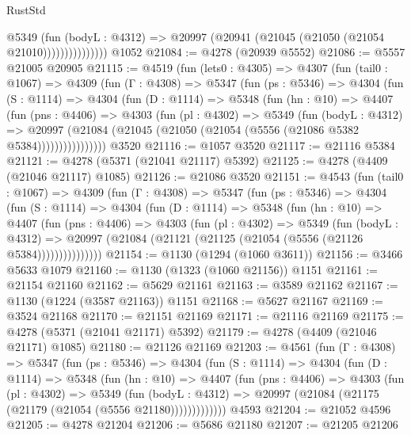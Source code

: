 \begin{lexlean}{RustStd}
\begin{coremodule}
{\begin{coremodule}
{{{{{{{{{{{{{{{{{{{{{{{{{{{{{{{{{{{                      @5349
                        (fun (bodyL : @4312) =>
                        @20997 (@20941 (@21045 (@21050 (@21054 @21010)))))))))))))))
    @1052
@21084 := @4278 (@20939 @5552)
@21086 := @5557 @21005 @20905
@21115 := @4519
    (fun (lets0 : @4305) =>
    @4307
      (fun (tail0 : @1067) =>
      @4309
        (fun (Γ : @4308) =>
        @5347
          (fun (ps : @5346) =>
          @4304
            (fun (S : @1114) =>
            @4304
              (fun (D : @1114) =>
              @5348
                (fun (hn : @10) =>
                @4407
                  (fun (pns : @4406) =>
                  @4303
                    (fun (pl : @4302) =>
                    @5349
                      (fun (bodyL : @4312) =>
                      @20997
                        (@21084 (@21045 (@21050 (@21054 (@5556 (@21086 @5382 @5384))))))))))))))))
    @3520
@21116 := @1057 @3520
@21117 := @21116 @5384
@21121 := @4278 (@5371 (@21041 @21117) @5392)
@21125 := @4278 (@4409 (@21046 @21117) @1085)
@21126 := @21086 @3520
@21151 := @4543
    (fun (tail0 : @1067) =>
    @4309
      (fun (Γ : @4308) =>
      @5347
        (fun (ps : @5346) =>
        @4304
          (fun (S : @1114) =>
          @4304
            (fun (D : @1114) =>
            @5348
              (fun (hn : @10) =>
              @4407
                (fun (pns : @4406) =>
                @4303
                  (fun (pl : @4302) =>
                  @5349
                    (fun (bodyL : @4312) =>
                    @20997 (@21084 (@21121 (@21125 (@21054 (@5556 (@21126 @5384)))))))))))))))
@21154 := @1130 (@1294 (@1060 @3611))
@21156 := @3466 @5633 @1079
@21160 := @1130 (@1323 (@1060 @21156)) @1151
@21161 := @21154 @21160
@21162 := @5629 @21161
@21163 := @3589 @21162
@21167 := @1130 (@1224 (@3587 @21163)) @1151
@21168 := @5627 @21167
@21169 := @3524 @21168
@21170 := @21151 @21169
@21171 := @21116 @21169
@21175 := @4278 (@5371 (@21041 @21171) @5392)
@21179 := @4278 (@4409 (@21046 @21171) @1085)
@21180 := @21126 @21169
@21203 := @4561
    (fun (Γ : @4308) =>
    @5347
      (fun (ps : @5346) =>
      @4304
        (fun (S : @1114) =>
        @4304
          (fun (D : @1114) =>
          @5348
            (fun (hn : @10) =>
            @4407
              (fun (pns : @4406) =>
              @4303
                (fun (pl : @4302) =>
                @5349
                  (fun (bodyL : @4312) =>
                  @20997 (@21084 (@21175 (@21179 (@21054 (@5556 @21180)))))))))))))
    @4593
@21204 := @21052 @4596
@21205 := @4278 @21204
@21206 := @5686 @21180
@21207 := @21205 @21206
}}}}}}}}}}}}}}}}}}}}}}}}}}}}}}}}}}}
\end{coremodule}}
\end{coremodule}
\end{lexlean}
